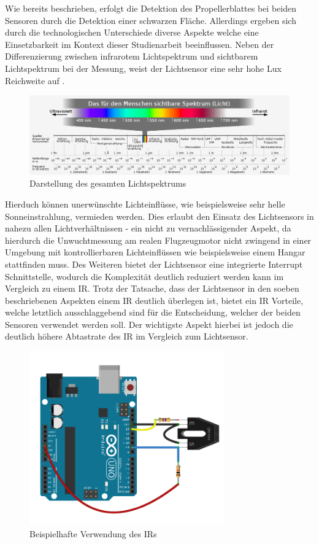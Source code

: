 Wie bereits beschrieben, erfolgt die Detektion des Propellerblattes bei beiden Sensoren durch die Detektion einer schwarzen Fläche. 
Allerdings ergeben sich durch die technologischen Unterschiede diverse Aspekte welche eine Einsetzbarkeit im Kontext dieser Studienarbeit beeinflussen.
Neben der Differenzierung zwischen infrarotem Lichtspektrum und sichtbarem Lichtspektrum bei der Messung, weist der Lichtsensor eine sehr hohe Lux Reichweite auf \cite[S.1]{tsl2591_datasheet}.
\begin{figure}[H]
	\centering
	\includegraphics[width=\textwidth]{images/chapter/03/lichtspektrum.png}
	\caption{Darstellung des gesamten Lichtspektrums \cite[]{light_spectrum}}
\end{figure}
Hierduch können unerwünschte Lichteinflüsse, wie beispielsweise sehr helle Sonneinstrahlung, vermieden werden.
Dies erlaubt den Einsatz des Lichtsensors in nahezu allen Lichtverhältnissen - ein nicht zu vernachlässigender Aspekt, da hierdurch die Unwuchtmessung am realen Flugzeugmotor nicht zwingend in einer Umgebung mit kontrollierbaren Lichteinflüssen wie beispielsweise einem Hangar stattfinden muss.
Des Weiteren bietet der Lichtsensor eine integrierte Interrupt Schnittstelle, wodurch die Komplexität deutlich reduziert werden kann im Vergleich zu einem \ac{IR}.
Trotz der Tatsache, dass der Lichtsensor in den soeben beschriebenen Aspekten einem \ac{IR} deutlich überlegen ist, bietet ein \ac{IR} Vorteile, welche letztlich ausschlaggebend sind für die Entscheidung, welcher der beiden Sensoren verwendet werden soll.
Der wichtigste Aspekt hierbei ist jedoch die deutlich höhere Abtastrate des \ac{IR} im Vergleich zum Lichtsensor. 
\begin{figure}[H]
	\centering
	\includegraphics[width=0.75\textwidth]{images/chapter/03/sensor_ir_schaltung.png}
	\caption{Beispielhafte Verwendung des \ac{IR}s \cite{sensor_ir_schaltung}}
	\label{fig:ir_example}
\end{figure}

